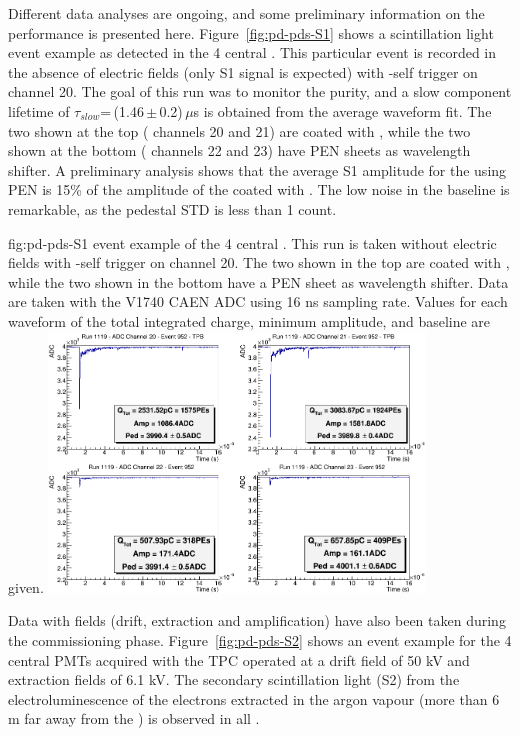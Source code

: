 Different data analyses are ongoing, and some preliminary information on the   performance is presented here. Figure~\ref{fig:pd-pds-S1} shows a scintillation light event example as detected in the 4 central . This particular event is recorded in the absence of electric fields (only S1 signal is expected) with -self trigger on  channel 20. The goal of this run was to monitor the  purity, and a slow component lifetime of $\tau_{slow}$=\,(1.46\,$\pm$\,0.2)\,$\mu$s is obtained from the average waveform fit. The two  shown at the top ( channels 20 and 21) are coated with , while the two shown at the bottom ( channels 22 and 23) have PEN sheets as wavelength shifter. A preliminary analysis shows that the average S1 amplitude for the  using PEN is 15\% of the amplitude of the  coated with . The low noise in the baseline is remarkable, as the pedestal STD is less than 1  count.

\begin{dunefigure}{fig:pd-pds-S1} { event example of the 4 central . This run is taken without electric fields with -self trigger on  channel 20. The two  shown in the top are coated with , while the two shown in the bottom have a PEN sheet as wavelength shifter. Data are taken with the V1740 CAEN ADC using 16 ns sampling rate. Values for each waveform of the total integrated charge, minimum amplitude, and baseline are given.}
\includegraphics[width=0.75\textwidth]{graphics/dppd_S1.png}
\end{dunefigure}

Data with fields (drift, extraction and amplification) have also been taken during the commissioning phase. Figure~\ref{fig:pd-pds-S2} shows an event example for the 4 central PMTs acquired with the TPC operated at a drift field of 50 kV and extraction fields of 6.1 kV. The secondary scintillation light (S2) from the electroluminescence of the electrons extracted in the argon vapour (more than 6 m far away from the ) is observed in all .

